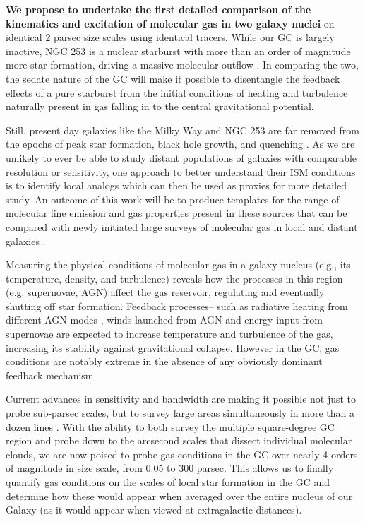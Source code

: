 \documentclass{aastex62}
\begin{document}
{\bf We propose to undertake the first detailed comparison of the kinematics and excitation of molecular gas in two galaxy nuclei} on identical 2 parsec size scales using identical tracers. While our GC is largely inactive, NGC 253 is a nuclear starburst with more than an order of magnitude more star formation, driving a massive molecular outflow \citep{Bolatto13}. In comparing the two, the sedate nature of the GC will make it possible to disentangle the feedback effects of a pure starburst \citep[like the GC, the black hole at the center of NGC 253 is believed to be quiescent;][]{MS10,Lehmer13} from the initial conditions of heating and turbulence naturally present in gas falling in to the central gravitational potential. 

Still, present day galaxies like the Milky Way and NGC 253 are far removed from the epochs of peak star formation, black hole growth, and quenching \citep[z$>$ 1;][]{Madau98, Hasinger05, Whitaker12}.  As we are unlikely to ever be able to study distant populations of galaxies with comparable resolution or sensitivity, one approach to better understand their ISM conditions is to identify local analogs which can then be used as proxies for more detailed study. An outcome of this work will be to produce templates for the range of molecular line emission and gas properties present in these sources that can be compared with newly initiated large surveys of molecular gas in local and distant galaxies \citep[e.g., PHANGS and ASPECS;][]{Walter16,Leroy16}. 

Measuring the physical conditions of molecular gas in a galaxy nucleus (e.g., its temperature, density, and turbulence) reveals how the processes in this region (e.g. supernovae, AGN) affect the gas reservoir, regulating and eventually shutting off star formation. Feedback processes-- such as radiative heating from different AGN modes \citep[e.g.,][]{Xie17}, winds launched from AGN \citep[e.g.,][]{Yuan16} and energy input from supernovae \citep{Efst00} are expected to increase temperature and turbulence of the gas, increasing its stability against gravitational collapse. However in the GC, gas conditions are notably extreme \citep[T$>$50-400 K, $\sigma>$ 10 km/s on 10 pc size scales;][]{Shetty12,Mills13a,Ginsburg16} in the absence of any obviously dominant feedback mechanism. 

Current advances in sensitivity and bandwidth are making it possible not just to probe sub-parsec scales, but to survey large areas simultaneously in more than a dozen lines \citep[e.g.,][]{Jones12, Jones13, Ginsburg16, Krieger17}. With the ability to both survey the multiple square-degree GC region and probe down to the arcsecond scales that dissect individual molecular clouds, we are now poised to probe gas conditions in the GC over nearly 4 orders of magnitude in size scale, from 0.05 to 300 parsec. This allows us to finally  quantify gas conditions on the scales of local star formation in the GC and determine how these would appear when averaged over the entire nucleus of our Galaxy (as it would appear when viewed at extragalactic distances).
\end{document}
